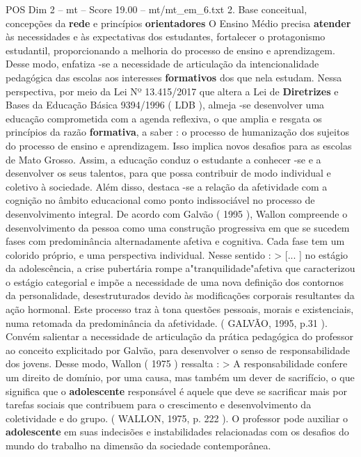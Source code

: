 \begin{textsample}{POS Dim 2 – mt – Score 19.00 – mt/mt\_em\_6.txt}  \label{ex:f2_pos_230}
2.
Base conceitual, concepções da \textbf{rede} e princípios \textbf{orientadores} O Ensino Médio precisa \textbf{atender} às necessidades e às expectativas dos estudantes, fortalecer o protagonismo estudantil, proporcionando a melhoria do processo de ensino e aprendizagem.
Desse modo, enfatiza -se a necessidade de articulação da intencionalidade pedagógica das escolas aos interesses \textbf{formativos} dos que nela estudam.
Nessa perspectiva, por meio da Lei Nº 13.415/2017 que altera a Lei de \textbf{Diretrizes} e Bases da Educação Básica 9394/1996 ( LDB ), almeja -se desenvolver uma educação comprometida com a agenda reflexiva, o que amplia e resgata os princípios da razão \textbf{formativa}, a saber : o processo de humanização dos sujeitos do processo de ensino e aprendizagem.
Isso implica novos desafios para as escolas de Mato Grosso.
Assim, a educação conduz o estudante a conhecer -se e a desenvolver os seus talentos, para que possa contribuir de modo individual e coletivo à sociedade.
Além disso, destaca -se a relação da afetividade com a cognição no âmbito educacional como ponto indissociável no processo de desenvolvimento integral.
De acordo com Galvão ( 1995 ), Wallon compreende o desenvolvimento da pessoa como uma construção progressiva em que se sucedem fases com predominância alternadamente afetiva e cognitiva.
Cada fase tem um colorido próprio, e uma perspectiva individual.
Nesse sentido : > [... ] no estágio da adolescência, a crise pubertária rompe a"tranquilidade"afetiva que caracterizou o estágio categorial e impõe a necessidade de uma nova definição dos contornos da personalidade, desestruturados devido às modificações corporais resultantes da ação hormonal.
Este processo traz à tona questões pessoais, morais e existenciais, numa retomada da predominância da afetividade. ( GALVÃO, 1995, p.31 ).
Convém salientar a necessidade de articulação da prática pedagógica do professor ao conceito explicitado por Galvão, para desenvolver o senso de responsabilidade dos jovens.
Desse modo, Wallon ( 1975 ) ressalta : > A responsabilidade confere um direito de domínio, por uma causa, mas também um dever de sacrifício, o que significa que o \textbf{adolescente} responsável é aquele que deve se sacrificar mais por tarefas sociais que contribuem para o crescimento e desenvolvimento da coletividade e do grupo. ( WALLON, 1975, p. 222 ).
O professor pode auxiliar o \textbf{adolescente} em suas indecisões e instabilidades relacionadas com os desafios do mundo do trabalho na dimensão da sociedade contemporânea.

\end{textsample}

